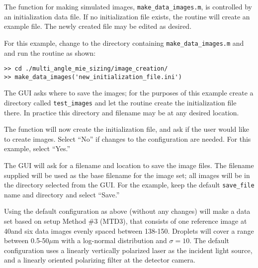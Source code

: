 The function for making simulated images, \texttt{make\_data\_images.m}, is controlled by an initialization data file.  If no initialization file exists, the routine will create an example file.  The newly created file may be edited as desired.

For this example, change to the directory containing \texttt{make\_data\_images.m} and and run the routine as shown:
\begin{verbatim}
>> cd ./multi_angle_mie_sizing/image_creation/
>> make_data_images('new_initialization_file.ini')
\end{verbatim}

The GUI asks where to save the images; for the purposes of this example create a directory called \texttt{test\_images} and let the routine create the initialization file there.  In practice this directory and filename may be at any desired location. 

The function will now create the initialization file, and ask if the user would like to create images.  Select ``No'' if changes to the configuration are needed.  For this example, select ``Yes.''

The GUI will ask for a filename and location to save the image files.  The filename supplied will be used as the base filename for the image set; all images will be in the directory selected from the GUI.  For the example, keep the default \texttt{save\_file} name and directory and select ``Save.''

Using the default configuration as above (without any changes) will make a data set based on setup Method \#3 (MTD3), that consists of one reference image at 40\textdegree and six data images evenly spaced between 138-150\textdegree.  Droplets will cover a range between 0.5-50$\mu$m with a log-normal distribution and $\sigma=10$.  The default configuration uses a linearly vertically polarized laser as the incident light source, and a linearly oriented polarizing filter at the detector camera.


